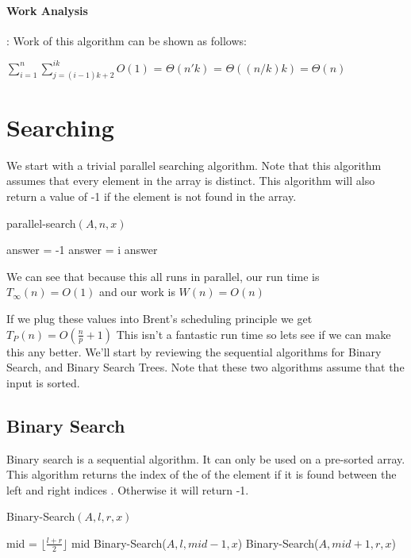 \documentclass[11pt]{article}
\begin{document}
\paragraph{Work Analysis}: Work of this algorithm can be shown as follows:


$\sum_{i=1}^{n} \sum_{j=(i-1)k+2}^{ik}O(1)$ =
$\Theta(n'k)$ =
$\Theta((n/k) k) = \Theta(n)$

\section{Searching}

We start with a trivial parallel searching algorithm. Note that this algorithm assumes that every element in the array is distinct. This algorithm will also return a value of -1 if the element is not found in the array.

\begin{algorithm}
\caption{parallel-search$(A,n,x)$}
\begin{algorithmic}
\STATE answer = -1
	    \STATE answer = i
	\ENDIF
\ENDFOR
\RETURN answer
\end{algorithmic}
\end{algorithm}

We can see that because this all runs in parallel, our run time is $T_\infty(n) = O(1)$ and our work is $W(n) = O(n)$

If we plug these values into Brent's scheduling principle we get
$T_P(n) = O(\frac{n}{p}+1)$ This isn't a fantastic run time so lets see if we can make this any better. We'll start by reviewing the sequential algorithms for Binary Search, and Binary Search Trees. Note that these two algorithms assume that the input is sorted.

\subsection{Binary Search}
Binary search is a sequential algorithm. It can only be used on a pre-sorted array. This algorithm returns the index of the of the element if it is found between the left and right indices . Otherwise it will return -1.
\pagebreak


\begin{algorithm}
\caption{Binary-Search$(A,l,r,x)$}
\begin{algorithmic}
\ELSE
    \STATE mid = $\lfloor\frac{l+r}{2}\rfloor$
        \RETURN mid
        \RETURN Binary-Search($A,l,mid-1,x$)
    \ELSE
        \RETURN Binary-Search($A,mid+1,r,x$)
    \ENDIF
\ENDIF
\end{algorithmic}
\end{algorithm}
\end{document}
